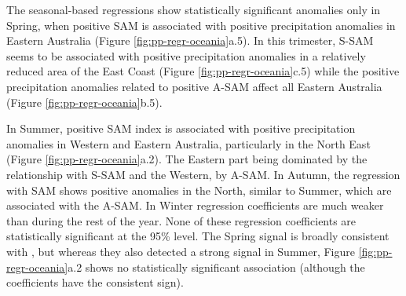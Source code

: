 \documentclass[smallextended]{svjour3}       %
\begin{document}
The seasonal-based regressions show statistically significant anomalies only in Spring, when positive SAM is associated with positive precipitation anomalies in Eastern Australia (Figure \ref{fig:pp-regr-oceania}a.5).
In this trimester, S\nobreakdash-SAM seems to be associated with positive precipitation anomalies in a relatively reduced area of the East Coast (Figure \ref{fig:pp-regr-oceania}c.5) while the positive precipitation anomalies related to positive A\nobreakdash-SAM affect all Eastern Australia (Figure \ref{fig:pp-regr-oceania}b.5).

In Summer, positive SAM index is associated with positive precipitation anomalies in Western and Eastern Australia, particularly in the North East (Figure \ref{fig:pp-regr-oceania}a.2).
The Eastern part being dominated by the relationship with S\nobreakdash-SAM and the Western, by A\nobreakdash-SAM.
In Autumn, the regression with SAM shows positive anomalies in the North, similar to Summer, which are associated with the A\nobreakdash-SAM.
In Winter regression coefficients are much weaker than during the rest of the year.
None of these regression coefficients are statistically significant at the 95\% level.
The Spring signal is broadly consistent with \citet{hendon2007}, but whereas they also detected a strong signal in Summer, Figure \ref{fig:pp-regr-oceania}a.2 shows no statistically significant association (although the coefficients have the consistent sign).
\end{document}
